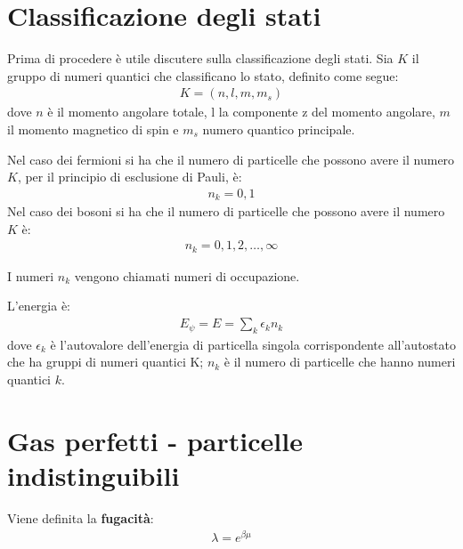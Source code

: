\section{Classificazione degli stati} %
Prima di procedere è utile discutere sulla classificazione degli stati. Sia $K$ il gruppo di numeri quantici che classificano lo stato, definito come segue:
\begin{equation}\begin{split}
K=\left(n,l,m,m_s\right)
\end{split}\end{equation}
dove $n$ è il momento angolare totale, l la componente z del momento angolare, $m$ il momento magnetico di spin e $m_s$ numero quantico principale.

Nel caso dei fermioni si ha che il numero di particelle che possono avere il numero $K$, per il principio di esclusione di Pauli, è:
\begin{equation}\begin{split}
n_k=0,1
\end{split}\end{equation}
Nel caso dei bosoni si ha che il numero di particelle che possono avere il numero $K$ è:
\begin{equation}\begin{split}
n_k=0,1,2,\dots,\infty 
\end{split}\end{equation}

I numeri $n_k$ vengono chiamati numeri di occupazione.

L'energia è:
\begin{equation}\begin{split}
E_\psi =E=\sum_k{\epsilon_kn_k}
\end{split}\end{equation}
dove $\epsilon_k$ è l'autovalore dell'energia di particella singola corrispondente all'autostato che ha gruppi di numeri quantici K; $n_k$ è il numero di particelle che hanno numeri quantici $k$.

\section{Gas perfetti - particelle indistinguibili} %
Viene definita la \textbf{fugacità}:
\begin{equation}\begin{split}
\lambda=e^{\beta \mu}
\end{split}\end{equation}

